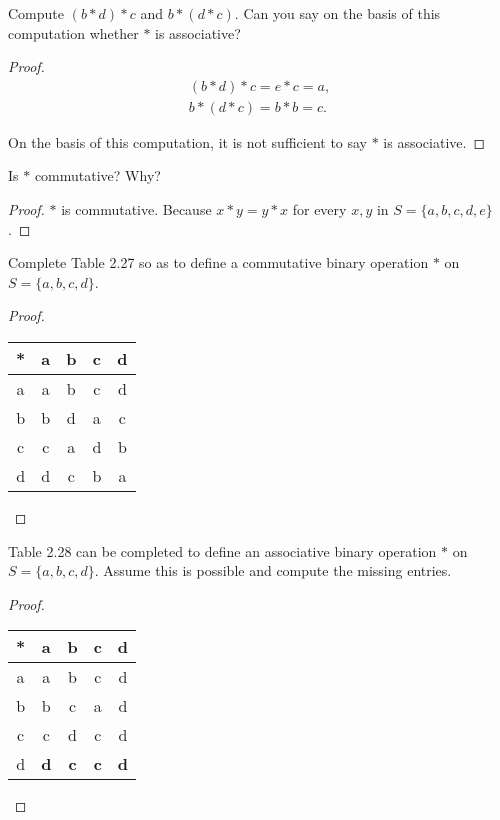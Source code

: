 \begin{exercise}
    Compute $(b * d) * c$ and $b * (d * c)$. Can you say on the basis of this computation whether $*$ is associative?
\end{exercise}

\begin{proof}
    \[
        \begin{split}
            (b * d) * c = e * c = a, \\
            b * (d * c) = b * b = c.
        \end{split}
    \]

    On the basis of this computation, it is not sufficient to say $*$ is associative.
\end{proof}

\begin{exercise}
    Is $*$ commutative? Why?
\end{exercise}

\begin{proof}
    $*$ is commutative. Because $x * y = y * x$ for every $x, y$ in $S = \{ a, b, c, d, e \}$.
\end{proof}

\begin{exercise}
    Complete Table 2.27 so as to define a commutative binary operation $*$ on $S = \{ a, b, c, d \}$.
\end{exercise}

\begin{proof}
    \begin{tabular}{c|c|c|c|c}
        * & a & b & c & d \\
        \midrule
        a & a & b & c & d \\
        b & b & d & a & c \\
        c & c & a & d & b \\
        d & d & c & b & a
    \end{tabular}
\end{proof}

\begin{exercise}
    Table 2.28 can be completed to define an associative binary operation $*$ on $S = \{ a, b, c, d \}$. Assume this is possible and compute the missing entries.
\end{exercise}

\begin{proof}
    \begin{tabular}{c|c|c|c|c}
        * & a          & b          & c          & d          \\
        \midrule
        a & a          & b          & c          & d          \\
        b & b          & c          & a          & d          \\
        c & c          & d          & c          & d          \\
        d & \textbf{d} & \textbf{c} & \textbf{c} & \textbf{d}
    \end{tabular}
\end{proof}

